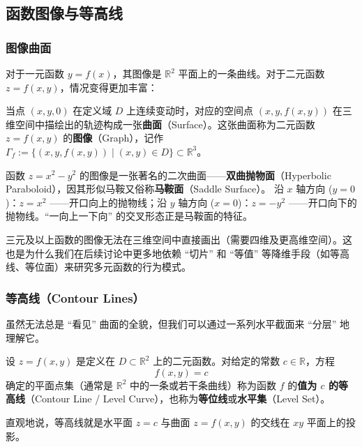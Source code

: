 \documentclass[lang=cn,11pt]{elegantbook}
\begin{document}
\subsection{函数图像与等高线}

\subsubsection*{图像曲面}

对于一元函数 $y=f(x)$，其图像是 $\mathbb{R}^2$ 平面上的一条曲线。对于二元函数 $z=f(x,y)$，情况变得更加丰富：

当点 $(x,y,0)$ 在定义域 $D$ 上连续变动时，对应的空间点 $(x,y,f(x,y))$ 在三维空间中描绘出的轨迹构成一张\textbf{曲面}（Surface）。这张曲面称为二元函数 $z=f(x,y)$ 的\textbf{图像}（Graph），记作 $\Gamma_f:=\bigl\{(x,y,f(x,y))\mid(x,y)\in D\bigr\}\subset\mathbb{R}^3$。

\begin{exercise}[双曲抛物面] \label{ex:hyperbolic-paraboloid}
函数 $z=x^2-y^2$ 的图像是一张著名的二次曲面——\textbf{双曲抛物面}（Hyperbolic Paraboloid），因其形似马鞍又俗称\textbf{马鞍面}（Saddle Surface）。
沿 $x$ 轴方向 ($y=0$)：$z=x^2$ ——开口向上的抛物线；沿 $y$ 轴方向 ($x=0$)：$z=-y^2$ ——开口向下的抛物线。``一向上一下向'' 的交叉形态正是马鞍面的特征。
\end{exercise}

\begin{note}[高维可视化]
三元及以上函数的图像无法在三维空间中直接画出（需要四维及更高维空间）。这也是为什么我们在后续讨论中更多地依赖 ``切片'' 和 ``等值'' 等降维手段（如等高线、等位面）来研究多元函数的行为模式。
\end{note}


\subsubsection*{等高线（Contour Lines）}

虽然无法总是 ``看见'' 曲面的全貌，但我们可以通过一系列水平截面来 ``分层'' 地理解它。

\begin{definition} \label{def:contour-line}
设 $z=f(x,y)$ 是定义在 $D\subset\mathbb{R}^2$ 上的二元函数。对给定的常数 $c\in\mathbb{R}$，方程
\[
f(x,y)=c
\]
确定的平面点集（通常是 $\mathbb{R}^2$ 中的一条或若干条曲线）称为函数 $f$ 的\textbf{值为 $c$ 的等高线}（Contour Line / Level Curve），也称为\textbf{等位线}或\textbf{水平集}（Level Set）。

直观地说，等高线就是水平面 $z=c$ 与曲面 $z=f(x,y)$ 的交线在 $xy$ 平面上的投影。
\end{definition}
\end{document}

